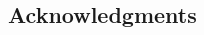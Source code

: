 \thispagestyle{empty}
\begin{spacing}{1.0}
\chapter*{Acknowledgments}
    
    
\clearpage
\end{spacing}